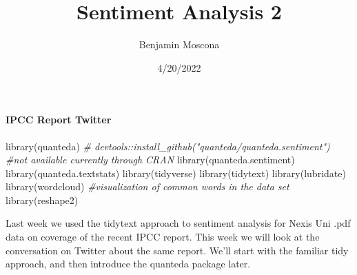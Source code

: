 \documentclass[
]{article}
\title{Sentiment Analysis 2}
\author{Benjamin Moscona}
\date{4/20/2022}
\newenvironment{Shaded}{\begin{snugshade}}{\end{snugshade}}
\newcommand{\AttributeTok}[1]{\textcolor[rgb]{0.77,0.63,0.00}{#1}}
\newcommand{\CommentTok}[1]{\textcolor[rgb]{0.56,0.35,0.01}{\textit{#1}}}
\newcommand{\ConstantTok}[1]{\textcolor[rgb]{0.00,0.00,0.00}{#1}}
\newcommand{\DecValTok}[1]{\textcolor[rgb]{0.00,0.00,0.81}{#1}}
\newcommand{\FunctionTok}[1]{\textcolor[rgb]{0.00,0.00,0.00}{#1}}
\newcommand{\NormalTok}[1]{#1}
\newcommand{\OtherTok}[1]{\textcolor[rgb]{0.56,0.35,0.01}{#1}}
\newcommand{\SpecialCharTok}[1]{\textcolor[rgb]{0.00,0.00,0.00}{#1}}
\newcommand{\StringTok}[1]{\textcolor[rgb]{0.31,0.60,0.02}{#1}}
\begin{document}
\maketitle

\hypertarget{ipcc-report-twitter}{%
\paragraph{IPCC Report Twitter}\label{ipcc-report-twitter}}

\begin{Shaded}
\begin{Highlighting}[]
\FunctionTok{library}\NormalTok{(quanteda)}
\CommentTok{\# devtools::install\_github("quanteda/quanteda.sentiment") \#not available currently through CRAN}
\FunctionTok{library}\NormalTok{(quanteda.sentiment)}
\FunctionTok{library}\NormalTok{(quanteda.textstats)}
\FunctionTok{library}\NormalTok{(tidyverse)}
\FunctionTok{library}\NormalTok{(tidytext)}
\FunctionTok{library}\NormalTok{(lubridate)}
\FunctionTok{library}\NormalTok{(wordcloud) }\CommentTok{\#visualization of common words in the data set}
\FunctionTok{library}\NormalTok{(reshape2)}
\end{Highlighting}
\end{Shaded}

Last week we used the tidytext approach to sentiment analysis for Nexis
Uni .pdf data on coverage of the recent IPCC report. This week we will
look at the conversation on Twitter about the same report. We'll start
with the familiar tidy approach, and then introduce the quanteda package
later.

\begin{Shaded}
\end{Shaded}
\end{document}
